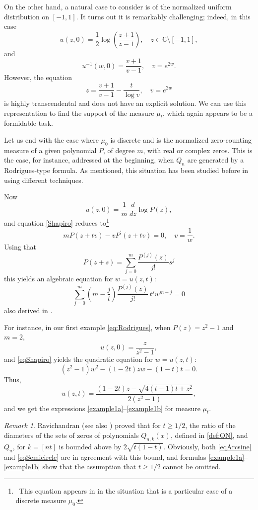 \documentclass[reqno,11pt]{amsart}
\theoremstyle{plain}
\theoremstyle{definition}
\theoremstyle{remark}
\newtheorem{remark}[thm]{Remark}
\numberwithin{equation}{section}
\numberwithin{equation}{section}
\newcommand{\C}{\mathbb{C}}
\begin{document}
\medskip

On the other hand, a natural case to consider is of the normalized uniform distribution on $[-1,1]$. It turns out it is remarkably challenging; indeed, in this case
	$$
	u(z,0)=\frac{1}{2}\log \left( \frac{z+1}{z-1}\right) , \quad z\in \C\setminus [-1,1],
	$$
	and
	$$
	u^{-1} (w, 0)=\frac{ v+1}{v-1}, \quad v=e^{2w}.
	$$
However, the equation\begin{equation} \label{lebesgue}
	z= \frac{ v+1}{v-1} - \frac{t}{\log v}, \quad v=e^{2w}
	\end{equation}
is highly transcendental and does not have an explicit solution. We can use this representation to find the support of the measure $\mu_t$, which again appears to be a formidable task.

\medskip

Let us end with the case where $\mu_0$ is discrete and is the normalized zero-counting measure of a given polynomial $P$, of degree $m$, with real or complex zeros. This is the case, for instance, addressed at the beginning, when $Q_n$ are generated by a Rodrigues-type formula. As mentioned, this situation has been studied before in \cite{ShapiroRodrigues} using different techniques. 

Now
 $$
 u(z, 0)=\frac{1}{m}\, \frac{d}{d z} \log P(z),
 $$
and equation  \eqref{Shapiro} reduces to\footnote{\, This equation appears in \cite[formula (1.6)]{ShapiroRodrigues} in the situation that is a particular case of a discrete measure $\mu_0 $.}
 $$
m P(z+t v)-v P^{\prime}(z+t v)=0, \quad v=\frac{1}{w} .
 $$
 Using that
 $$
 P(z+s)=\sum_{j=0}^m \frac{P^{(j)}(z)}{j !} s^j
 $$
 this yields an algebraic equation for $w=u(z,t)$:
 \begin{equation}\label{eqShapiro}
 \sum_{j=0}^m  \left(m-\frac{j}{t}\right) \frac{P^{(j)}(z)}{j !} \, t^j w^{m-j}=0 
 \end{equation}
 also derived in \cite{ShapiroRodrigues}.

For instance, in our first example \eqref{eq:Rodrigues}, when $P(z)=z^2-1$ and $m=2$, 
	$$
	u(z,0)= \frac{z }{z^2-1}, 
	$$
	and \eqref{eqShapiro} yields the quadratic equation for $w=u(z,t)$:
	$$
	(z^2-1)  w^2- (1-2t) z w -   (1-t) t=0. 
	$$
Thus,
	$$
	u(z,t) = \frac{(1-2t) z -\sqrt{4 (t-1) t+z^2} }{2 \left(z^2-1\right)},
	$$
and we get the expressions \eqref{example1a}--\eqref{example1b} for measure $\mu_t$. 

\begin{remark} \label{remarkBound}
Ravichandran \cite{MR4130852} (see also \cite{MR4279350}) proved that for $t\ge 1/2$, the ratio of the diameters of the sets of zeros of polynomials $Q_{n,k}(x) $, defined in \eqref{def:QN}, and $Q_n$, for $k=[nt]$ is bounded above by $2\sqrt{t(1-t)}$. Obviously, both \eqref{eqArcsine} and \eqref{eqSemicircle} are in agreement with this bound, and formulas \eqref{example1a}--\eqref{example1b} show that the assumption that $t\ge 1/2$ cannot be omitted. 
\end{remark}
\end{document}
